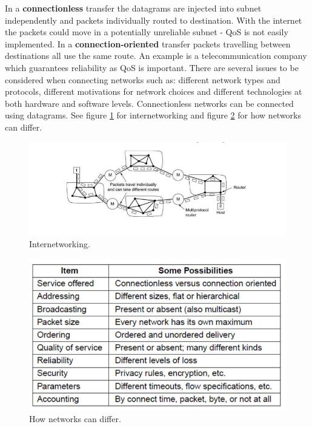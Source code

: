 \documentclass[twoside]{article}
\begin{document}
In a \textbf{connectionless} transfer the datagrams are injected into subnet
independently and packets individually routed to destination. With the internet
the packets could move in a potentially unreliable subnet - QoS is not easily 
implemented. In a \textbf{connection-oriented} transfer packets travelling 
between destinations all use the same route. An example is a telecommunication
company which guarantees reliability as QoS is important. There are several 
issues to be considered when connecting networks such as: different network
types and protocols, different motivations for network choices and different
technologies at both hardware and software levels. Connectionless networks
can be connected using datagrams. See figure \ref{fig:internetworking} for 
internetworking and figure \ref{fig:network-diff} for how networks can differ.
\begin{figure}
  \includegraphics[width=\linewidth]{internetworking.png}
  \caption{Internetworking.}
  \label{fig:internetworking}
\end{figure}
\begin{figure}
  \includegraphics[width=\linewidth]{network-diff.png}
  \caption{How networks can differ.}
  \label{fig:network-diff}
\end{figure}
\end{document}

